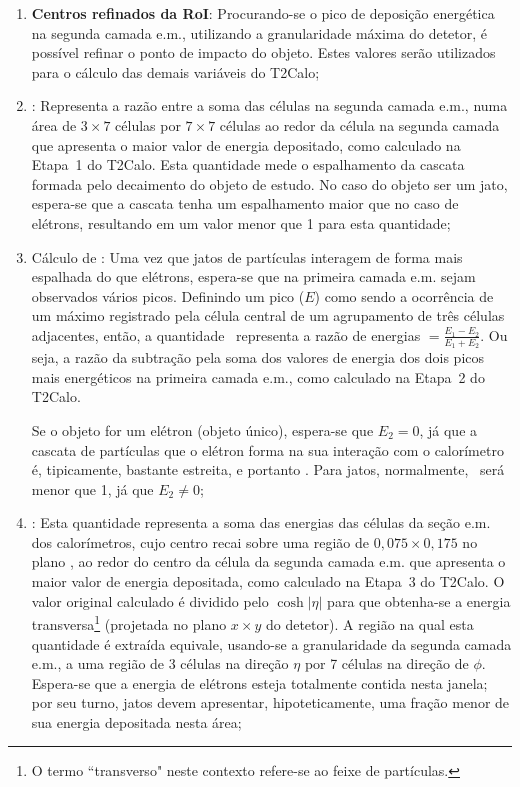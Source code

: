 \begin{enumerate}
\item \textbf{Centros refinados da RoI}: Procurando-se o pico de deposição
energética na segunda camada e.m., utilizando a granularidade máxima do
detetor, é possível refinar o ponto de impacto do objeto. Estes valores serão
utilizados para o cálculo das demais variáveis do T2Calo;

\item \textbf{\rcore}: Representa a razão entre a soma das células na segunda
camada e.m., numa área de $3 \times 7$ células por $7 \times 7$ células ao
redor da célula na segunda camada que apresenta o maior valor de energia
depositado, como calculado na Etapa~1 do T2Calo. Esta quantidade mede o
espalhamento da cascata formada pelo decaimento do objeto de estudo. No caso
do objeto ser um jato, espera-se que a cascata tenha um espalhamento maior que
no caso de elétrons, resultando em um valor menor que 1 para esta quantidade;

\item Cálculo de \textbf{\eratio}: Uma vez que jatos de par\-tí\-culas
interagem de forma mais espalhada do que e\-lé\-trons, espera-se que na
primeira camada e.m. sejam observados vários picos. Definindo um pico ($E$)
como sendo a ocorrência de um máximo registrado pela célula central de um
agrupamento de três células adjacentes, então, a quantidade \eratio\
representa a razão de energias \eratio$=\frac{E_1-E_2}{E_1+E_2}$. Ou seja, a
razão da subtração pela soma dos valores de energia dos dois picos mais
energéticos na primeira camada e.m., como calculado na Etapa~2 do T2Calo.

Se o objeto for um elétron (objeto único), espera-se que $E_2=0$, já que a
cascata de partículas que o elétron forma na sua interação com o calorímetro
é, tipicamente, bastante estreita, e portanto \eratio=1. Para jatos,
normalmente, \eratio\ será menor que 1, já que $E_2 \neq 0$;

\item \textbf{\etem}: Esta quantidade representa a soma das energias das
células da seção e.m. dos calorímetros, cujo centro recai sobre uma região de
$0,075 \times 0,175$ no plano \ep, ao redor do centro da célula da segunda
camada e.m. que apresenta o maior valor de energia depositada, como calculado
na Etapa~3 do T2Calo. O valor original calculado é dividido pelo
$\cosh{|\eta|}$ para que obtenha-se a energia transversa\footnote{O termo
``transverso" neste contexto refere-se ao feixe de partículas.} (projetada no
plano $x \times y$ do detetor). A região na qual esta quantidade é extraída
equivale, usando-se a granularidade da segunda camada e.m., a uma região de 3
células na direção $\eta$ por 7 células na direção de $\phi$. Espera-se que a
energia de elétrons esteja totalmente contida nesta janela; por seu turno,
jatos devem apresentar, hipoteticamente, uma fração menor de sua energia
depositada nesta área;


\end{enumerate}
